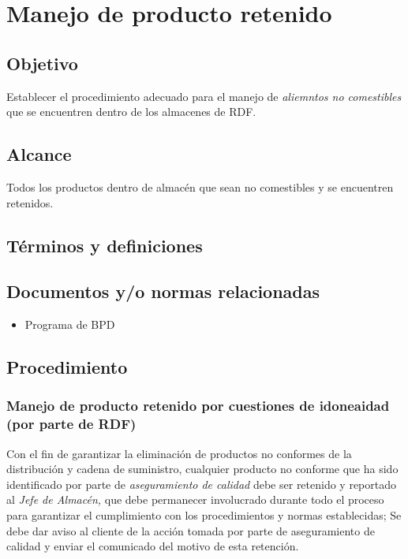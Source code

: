 \thispagestyle{formato-PI}
\renewcommand{\MayorVer}{2}
\renewcommand{\MenorVer}{0}
\renewcommand{\Codigo}{PSA-1-PROG} %
\renewcommand{\FechaPub}{2023--01}
\renewcommand{\Titulo}{Manejo de producto retenido}
\section{\Titulo}

\subsection{Objetivo}
Establecer el procedimiento adecuado para el manejo de \emph{aliemntos no comestibles} que se encuentren dentro de los almacenes de \gls{RDF}.

\subsection{Alcance}
Todos los productos dentro de almacén que sean no comestibles y se encuentren retenidos.

\subsection{Términos y definiciones}
\begin{description}
\end{description}

\subsection{Documentos y/o normas relacionadas}
\begin{itemize}
	\item Programa de \gls{BPD}
\end{itemize}

\subsection{Procedimiento}
\subsubsection{Manejo de producto retenido por cuestiones de idoneaidad (por parte de RDF)}
Con el fin de garantizar la eliminación de productos no conformes de la distribución y cadena de suministro, cualquier producto no conforme que ha sido identificado por parte de \emph{aseguramiento de calidad} debe ser retenido y reportado al \emph{Jefe de Almacén,} que debe permanecer involucrado durante todo el proceso para garantizar el cumplimiento con los procedimientos y normas establecidas; Se debe dar aviso al cliente de la acción tomada por parte de aseguramiento de calidad y enviar el comunicado del motivo de esta retención.

